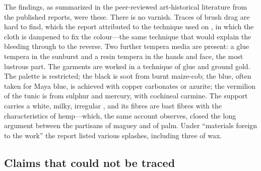 The findings, as summarized in the peer-reviewed art-historical
literature from the published reports, were these. There is no
varnish. Traces of brush drag are hard to find, which the report
attributed to the  technique used on , in
which the cloth is dampened to fix the colour---the same technique
that would explain the bleeding through to the reverse. Two further
tempera media are present: a glue tempera in the sunburst and a resin
tempera in the hands and face, the most lustrous part. The garments
are worked in a technique of glue and ground gold. The palette is
restricted; the black is soot from burnt maize-cob; the blue, often
taken for Maya blue, is achieved with copper carbonates or azurite;
the vermilion of the tunic is from sulphur and mercury, with cochineal
carmine. The support carries a white, milky, irregular
, and its fibres are bast fibres with the
characteristics of hemp---which, the same account observes, closed
the long argument between the partisans of maguey and of palm. Under
``materials foreign to the work'' the report listed various splashes,
including three of wax.

\subsection{Claims that could not be traced}

